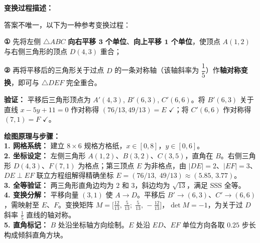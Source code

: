 \begin{center}
\end{center}

\vspace{0.3cm}
\textbf{变换过程描述：}

答案不唯一，以下为一种参考变换过程：

\textbf{①} 先将左侧 $\triangle ABC$ \textbf{向右平移 $\mathbf{3}$ 个单位}、\textbf{向上平移 $\mathbf{1}$ 个单位}，使顶点 $A(1,2)$ 与右侧三角形的顶点 $D(4,3)$ 重合；

\textbf{②} 再将平移后的三角形关于过点 $D$ 的一条对称轴（该轴斜率为 $\dfrac{1}{5}$）作\textbf{轴对称变换}，即可与 $\triangle DEF$ 完全重合。

\vspace{0.2cm}
{\small
\textbf{验证：} 平移后三角形顶点为 $A'(4,3)$, $B'(6,3)$, $C'(6,6)$。将 $B'(6,3)$ 关于直线 $x - 5y + 11 = 0$ 作对称得 $(76/13, 49/13) = E$ $\checkmark$；将 $C'(6,6)$ 作对称得 $(7, 1) = F$ $\checkmark$。
}

\vspace{0.4cm}
{\small\color{blue!70!black}
\textbf{绘图原理与步骤：}\\
\textbf{1. 网格系统：} 建立 $8 \times 6$ 规格方格纸，$x \in [0,8]$，$y \in [0,6]$。\\
\textbf{2. 坐标设定：} 左侧三角形 $A(1,2)$、$B(3,2)$、$C(3,5)$，直角在 $B$。右侧三角形 $D(4,3)$、$F(7,1)$ 为格点；第三顶点 $E$ 为非格点，由 $|DE|=2$、$|EF|=3$、$DE \perp EF$ 联立方程组解得精确坐标 $E = (76/13,\; 49/13) \approx (5.85,\, 3.77)$。\\
\textbf{3. 全等验证：} 两三角形直角边均为 $2$ 和 $3$，斜边均为 $\sqrt{13}$，满足 SSS 全等。\\
\textbf{4. 变换分解：} 平移向量 $(3,1)$ 使 $A \to D$。平移后 $B' \to (6,3)$、$C' \to (6,6)$，需映射至 $E$、$F$。变换矩阵 $M = \bigl[\frac{12}{13},\, \frac{5}{13};\; \frac{5}{13},\, {-}\frac{12}{13}\bigr]$，$\det M = -1$，为关于过 $D$ 斜率 $\frac{1}{5}$ 直线的轴对称。\\
\textbf{5. 直角标记：} $B$ 处沿坐标轴方向绘制。$E$ 处沿 $ED$、$EF$ 单位方向各取 $0.25$ 步长构成倾斜直角方块。
}

